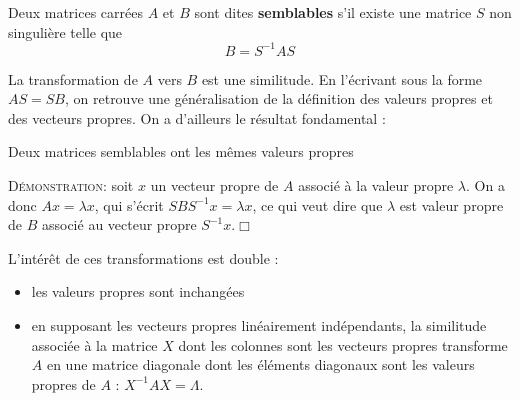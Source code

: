 \begin{defin}
Deux matrices carrées $A$ et $B$ sont dites \textbf{semblables} 
s'il existe une matrice $S$ non singulière telle que 
$$B=S^{-1}AS$$
\end{defin}
La transformation de $A$ vers $B$ est une {\gr similitude}. En l'écrivant sous la forme $AS=SB$, on retrouve une généralisation de la définition des valeurs propres et des vecteurs propres. On a d'ailleurs le résultat fondamental :
\begin{prop}
Deux matrices semblables ont les mêmes valeurs propres
\end{prop}
\textsc{Démonstration:} soit $x$ un vecteur propre de $A$ associé à la valeur propre $\lambda$. On a donc $Ax=\lambda x$, qui s'écrit $SBS^{-1}x=\lambda x$, ce qui veut dire que $\lambda$ est valeur propre de $B$ associé au vecteur propre $S^{-1}x$.\hfill$\Box$


L'intérêt de ces transformations est double : 
\begin{itemize}
	\item les valeurs propres sont inchangées
	\item en supposant les vecteurs propres linéairement indépendants, la similitude associée à la matrice $X$ dont les colonnes sont les vecteurs propres transforme $A$ en une matrice diagonale dont les éléments diagonaux sont les valeurs propres de $A$ : $X^{-1}AX = \Lambda$.
\end{itemize}

